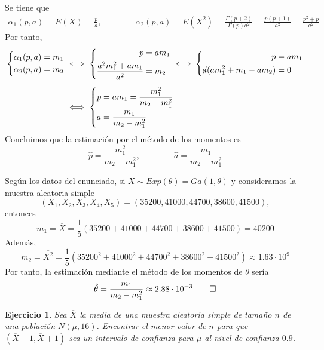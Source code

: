 \documentclass[11pt]{report}
\makeatletter
\renewenvironment{proof}[1][\proofname]{\par
  \pushQED{\qed}%
  \normalfont \topsep\z@skip %
  \trivlist
  \item[\hskip\labelsep
        \itshape
    #1\@addpunct{.}]\ignorespaces
}{%
  \popQED\endtrivlist\@endpefalse
}
\newtheorem{ejercicio}{Ejercicio}
\makeatother
\begin{document}
\begin{proof}
  Se tiene que
  \[\begin{aligned}
    \alpha_1(p,a) = E(X) = \frac{p}{a}, \qquad \qquad \alpha_2(p,a) = E(X^2) = \frac{\Gamma( p+2)}{\Gamma(p)a^2} = \frac{p(p+1)}{a^2} = \frac{p^2+p}{a^2}
  \end{aligned}\]
  Por tanto,
  \[\begin{aligned}[t]
    \left\{\begin{alignedat}{1}
    \alpha_1(p,a) &= m_1 \\
    \alpha_2(p,a) &= m_2
  \end{alignedat}\right. &\iff \left\{\begin{alignedat}{1}
    p &= am_1 \\
    \frac{a^2m_1^2+am_1}{a^2} &= m_2
  \end{alignedat}\right. \iff \left\{\begin{alignedat}{1}
    p &= am_1 \\
    \cancel{a}(am_1^2+m_1-am_2) &= 0
  \end{alignedat}\right. \\[5pt] &\iff \left\{\begin{alignedat}{1}
    p &= am_1 = \frac{m_1^2}{m_2-m_1^2} \\
    a &=\frac{m_1}{m_2-m_1^2}
  \end{alignedat}\right.
\end{aligned}
  \]
Concluimos que la estimación por el método de los momentos es
\[\hat{p} = \frac{m_1^2}{m_2-m_1^2} , \qquad \qquad \hat{a} = \frac{m_1}{m_2-m_1^2}\]

Según los datos del enunciado, si $X \sim Exp(\theta) = Ga(1,\theta)$ y consideramos la muestra aleatoria simple
\[(X_1,X_2,X_3,X_4,X_5) = (35200, 41000, 44700, 38600, 41500),\]
entonces
\[m_1 = \overline{X} = \frac{1}{5}(35200+41000+44700+38600+41500) = 40200\]
Además,
\[m_2 = \overline{X^2} = \frac{1}{5}(35200^2+41000^2+44700^2+38600^2+41500^2) \approx 1.63 \cdot 10^9\]
Por tanto, la estimación mediante el método de los momentos de $\theta$ sería
\[\hat{\theta} = \frac{m_1}{m_2-m_1^2}\approx 2.88 \cdot 10^{-3} \qedhere\]
\end{proof}

\begin{ejercicio}
  Sea $\overline{X}$ la media de una muestra aleatoria simple de tamaño $n$ de una población $N(\mu,16)$. Encontrar el menor valor de $n$ para que $(\overline{X}-1,\overline{X}+1)$ sea un intervalo de confianza para $\mu$ al nivel de confianza $0.9$.
\end{ejercicio}
\end{document}
